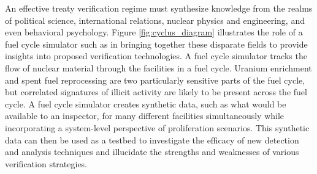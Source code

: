An effective treaty verification regime must synthesize knowledge from the realms of political science, international relations, nuclear physics and engineering, and even behavioral psychology.  Figure \ref{fig:cyclus_diagram} illustrates  the role of a fuel cycle simulator such as \Cyclus in bringing together these disparate fields to provide insights into proposed verification technologies. A fuel cycle simulator tracks the flow of nuclear material through the facilities in a fuel cycle\cite{huff_fundamental_2016}.  Uranium enrichment and spent fuel reprocessing are two particularly sensitive parts of the fuel cycle, but correlated signatures of illicit activity are likely to be present across the fuel cycle. A fuel cycle simulator creates synthetic data, such as what would be available to an inspector, for many different facilities simultaneously while incorporating a system-level perspective of proliferation scenarios. This synthetic data can then be used as a testbed to investigate the efficacy of new detection and analysis techniques and illucidate the strengths and weaknesses of various verification strategies.